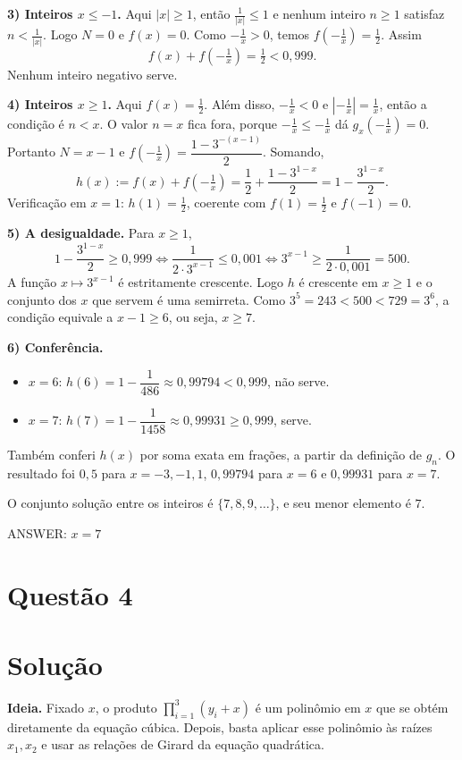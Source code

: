 \documentclass{article}%
\begin{document}
\textbf{3) Inteiros $x\le -1$.} Aqui $|x|\ge1$, então $\tfrac1{|x|}\le1$ e nenhum inteiro $n\ge1$ satisfaz $n<\tfrac1{|x|}$. Logo $N=0$ e $f(x)=0$. Como $-\tfrac1x>0$, temos $f\!\left(-\tfrac1x\right)=\tfrac12$. Assim
\[
f(x)+f\!\left(-\tfrac1x\right)=\tfrac12<0{,}999 .
\]
Nenhum inteiro negativo serve.

\textbf{4) Inteiros $x\ge 1$.} Aqui $f(x)=\tfrac12$. Além disso, $-\tfrac1x<0$ e $\left|-\tfrac1x\right|=\tfrac1x$, então a condição é $n<x$. O valor $n=x$ fica fora, porque $-\tfrac1x\le-\tfrac1x$ dá $g_x\!\left(-\tfrac1x\right)=0$. Portanto $N=x-1$ e $f\!\left(-\tfrac1x\right)=\dfrac{1-3^{-(x-1)}}{2}$. Somando,
\[
h(x):=f(x)+f\!\left(-\tfrac1x\right)=\frac12+\frac{1-3^{1-x}}{2}=1-\frac{3^{1-x}}{2}.
\]
Verificação em $x=1$: $h(1)=\tfrac12$, coerente com $f(1)=\tfrac12$ e $f(-1)=0$.

\textbf{5) A desigualdade.} Para $x\ge1$,
\[
1-\frac{3^{1-x}}{2}\ge 0{,}999
\iff \frac{1}{2\cdot3^{x-1}}\le 0{,}001
\iff 3^{x-1}\ge \frac{1}{2\cdot 0{,}001}=500 .
\]
A função $x\mapsto3^{x-1}$ é estritamente crescente. Logo $h$ é crescente em $x\ge1$ e o conjunto dos $x$ que servem é uma semirreta. Como $3^5=243<500<729=3^6$, a condição equivale a $x-1\ge6$, ou seja, $x\ge7$.

\textbf{6) Conferência.}
\begin{itemize}
\item $x=6$: $h(6)=1-\dfrac1{486}\approx0{,}99794<0{,}999$, não serve.
\item $x=7$: $h(7)=1-\dfrac1{1458}\approx0{,}99931\ge0{,}999$, serve.
\end{itemize}
Também conferi $h(x)$ por soma exata em frações, a partir da definição de $g_n$. O resultado foi $0{,}5$ para $x=-3,-1,1$, $0{,}99794$ para $x=6$ e $0{,}99931$ para $x=7$.

O conjunto solução entre os inteiros é $\{7,8,9,\dots\}$, e seu menor elemento é $7$.

ANSWER: $x=7$%
\newpage%
\section*{Questão 4}

\section*{Solução}

\textbf{Ideia.} Fixado $x$, o produto $\prod_{i=1}^{3}(y_i+x)$ é um polinômio em $x$ que se obtém diretamente da equação cúbica. Depois, basta aplicar esse polinômio às raízes $x_1,x_2$ e usar as relações de Girard da equação quadrática.
\end{document}
